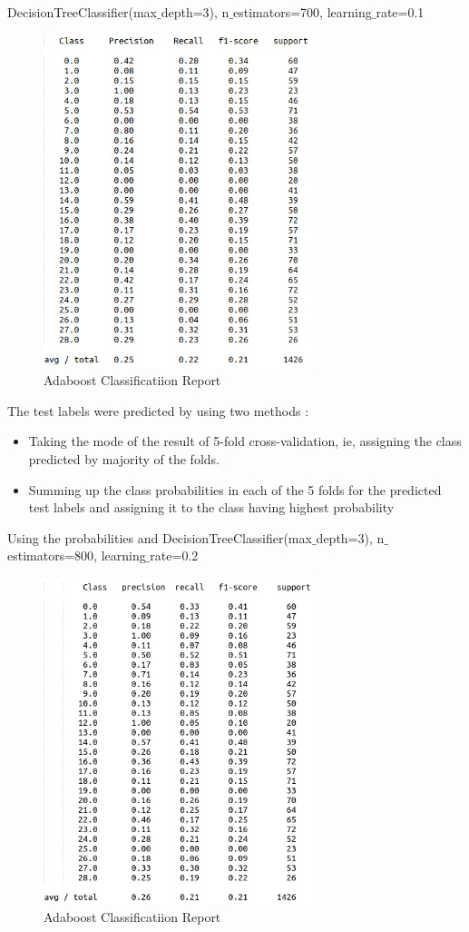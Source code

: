 \documentclass[12pt]{report}
\begin{document}
DecisionTreeClassifier(max$\_$depth=3), n$\_$estimators=700, learning$\_$rate=0.1
\begin{figure}[H]
  \centering
  \includegraphics[width=0.7\textwidth]{ab.png}
  \caption{Adaboost Classificatiion Report}
\end{figure}

The test labels were predicted by using two methods :
\begin{itemize}
    \item Taking the mode of the result of 5-fold cross-validation, ie, assigning the class predicted by majority of the folds.
    \item Summing up the class probabilities in each of the 5 folds for the predicted test labels and assigning it to the class having highest probability
\end{itemize}

Using the probabilities and DecisionTreeClassifier(max$\_$depth=3), n$\_$estimators=800, learning$\_$rate=0.2
\begin{figure}[H]
  \centering
  \includegraphics[width=0.7\textwidth]{Images/ab2.png}
  \caption{Adaboost Classificatiion Report}
\end{figure}
\end{document}
